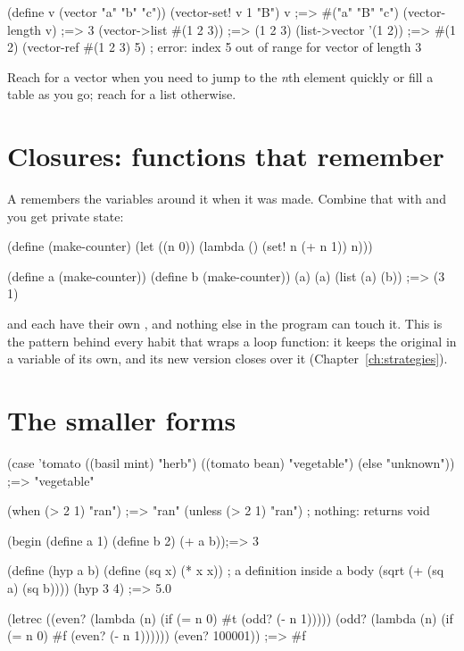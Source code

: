 \begin{scm}
(define v (vector "a" "b" "c"))
(vector-set! v 1 "B")
v                                        ;=> #("a" "B" "c")
(vector-length v)                        ;=> 3
(vector->list #(1 2 3))                  ;=> (1 2 3)
(list->vector '(1 2))                    ;=> #(1 2)
(vector-ref #(1 2 3) 5)    ; error: index 5 out of range for vector of length 3
\end{scm}

Reach for a vector when you need to jump to the \emph{n}th element quickly
or fill a table as you go; reach for a list otherwise.

\section{Closures: functions that remember}

A  remembers the variables around it when it was made. Combine
that with  and you get private state:

\begin{scm}
(define (make-counter)
  (let ((n 0))
    (lambda ()
      (set! n (+ n 1))
      n)))

(define a (make-counter))
(define b (make-counter))
(a) (a)
(list (a) (b))                           ;=> (3 1)
\end{scm}

 and  each have their own , and nothing else in the
program can touch it. This is the pattern behind every \nodwyn{} habit that
wraps a loop function: it keeps the original in a variable of its own, and
its new version closes over it (Chapter~\ref{ch:strategies}).

\section{The smaller forms}

\begin{scm}
(case 'tomato
  ((basil mint) "herb")
  ((tomato bean) "vegetable")
  (else "unknown"))                      ;=> "vegetable"

(when (> 2 1) "ran")                     ;=> "ran"
(unless (> 2 1) "ran")                   ; nothing: returns void

(begin (define a 1) (define b 2) (+ a b));=> 3

(define (hyp a b)
  (define (sq x) (* x x))                ; a definition inside a body
  (sqrt (+ (sq a) (sq b))))
(hyp 3 4)                                ;=> 5.0

(letrec ((even? (lambda (n) (if (= n 0) #t (odd? (- n 1)))))
         (odd?  (lambda (n) (if (= n 0) #f (even? (- n 1))))))
  (even? 100001))                        ;=> #f
\end{scm}

